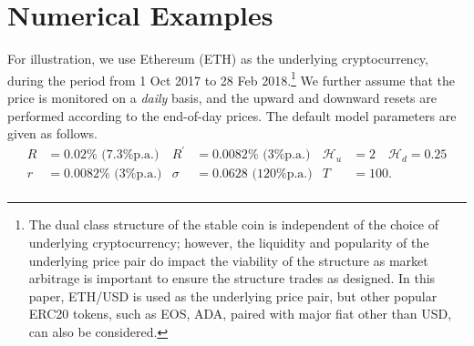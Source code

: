 \documentclass[11pt]{article}%
\numberwithin{equation}{section}
\theoremstyle{plain}
\begin{document}
\section{Numerical Examples}\label{sect:numerical}

For illustration, we use Ethereum (ETH) as the underlying cryptocurrency, during the period from 1 Oct 2017 to 28 Feb 2018.\footnote{The dual class structure of the stable coin is independent of the choice of underlying cryptocurrency; however, the liquidity and popularity of the underlying price pair do impact the viability of the structure as market arbitrage is important to ensure the structure trades as designed. In this paper, ETH/USD is used as the underlying price pair, but other popular ERC20 tokens, such as EOS, ADA, paired with major fiat other than USD, can also be considered.} We further assume that the price is monitored on a \emph{daily} basis, and the upward and downward resets are performed according to the end-of-day prices.
 The default model parameters are given as follows.
\begin{align*}
R& =0.02\% \text{ (7.3\% p.a.)} & R^\prime & = 0.0082\% \text{ (3\% p.a.)} &\mathcal{H}_{u} & =2 \quad \mathcal{H}_{d}  =0.25\\
r&=0.0082\% \text{ (3\% p.a.)}  & \sigma &= 0.0628 \text{ (120\% p.a.)}  & T &= 100. \\
\end{align*}


\end{document}
